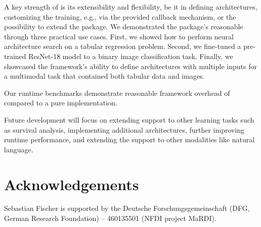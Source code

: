 \documentclass[article]{jss}
\theoremstyle{definition}
\begin{document}
A key strength of  is its extensibility and flexibility, be it in defining architectures, customizing the training, e.g., via the provided callback mechanism, or the possibility to extend the package.
We demonstrated the package's reasonable through three practical use cases. First, we showed how to perform neural architecture search on a tabular regression problem.
Second, we fine-tuned a pre-trained ResNet-18 model to a binary image classification task.
Finally, we showcased the framework's ability to define architectures with multiple inputs for a multimodal task that contained both tabular data and images.

Our runtime benchmarks demonstrate reasonable framework overhead of \mlrttorch{} compared to a pure \torch{} implementation.

Future development will focus on extending support to other learning tasks such as survival analysis, implementing additional architectures, further improving runtime performance, and extending the support to other modalities like natural language.

%

\section*{Acknowledgements}

Sebastian Fischer is supported by the Deutsche Forschungsgemeinschaft (DFG, German Research Foundation) – 460135501 (NFDI project MaRDI).


\end{document}
